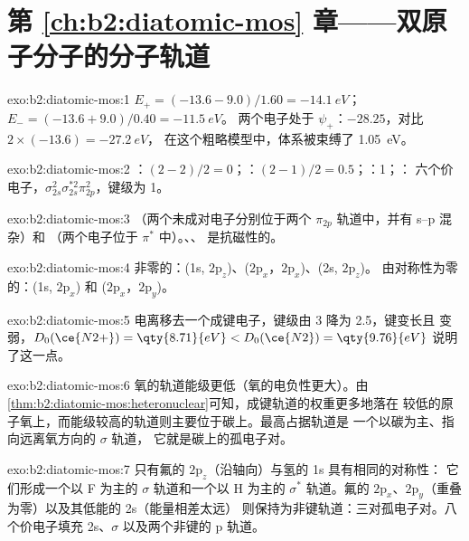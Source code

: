 \section*{第 \ref{ch:b2:diatomic-mos} 章——双原子分子的分子轨道}

\begin{solution}{exo:b2:diatomic-mos:1}
$E_+ = (-13.6 - 9.0)/1.60 = \qty{-14.1}{eV}$；$E_- = (-13.6 + 9.0)/0.40 = \qty{-11.5}{eV}$。
两个电子处于 $\psi_+$：$-28.25$，对比 $2 \times (-13.6) = \qty{-27.2}{eV}$，
在这个粗略模型中，体系被束缚了 \qty{1.05}{eV}。
\end{solution}

\begin{solution}{exo:b2:diatomic-mos:2}
：$(2 - 2)/2 = 0$；：$(2 - 1)/2 = 0.5$；：1；：
六个价电子，$\sigma_{2s}^2\sigma_{2s}^{*2}\pi_{2p}^2$，键级为 1。
\end{solution}

\begin{solution}{exo:b2:diatomic-mos:3}
（两个未成对电子分别位于两个 $\pi_{2p}$ 轨道中，并有 s--p 混杂）和
（两个电子位于 $\pi^*$ 中）。、、 是抗磁性的。
\end{solution}

\begin{solution}{exo:b2:diatomic-mos:4}
非零的：(1s, $2\mathrm p_z$)、($2\mathrm p_x$，$2\mathrm p_x$)、(2s, $2\mathrm p_z$)。
由对称性为零的：(1s, $2\mathrm p_x$) 和 ($2\mathrm p_x$，$2\mathrm p_y$)。
\end{solution}

\begin{solution}{exo:b2:diatomic-mos:5}
电离移去一个成键电子，键级由 3 降为 2.5，键变长且
变弱，$D_0(\ce{N2+}) = \qty{8.71}{eV} < D_0(\ce{N2}) = \qty{9.76}{eV}$ 说明了这一点。
\end{solution}

\begin{solution}{exo:b2:diatomic-mos:6}
氧的轨道能级更低（氧的电负性更大）。由
\cref{thm:b2:diatomic-mos:heteronuclear}可知，成键轨道的权重更多地落在
较低的原子氧上，而能级较高的轨道则主要位于碳上。最高占据轨道是
一个以碳为主、指向远离氧方向的 $\sigma$ 轨道，
它就是碳上的孤电子对。
\end{solution}

\begin{solution}{exo:b2:diatomic-mos:7}
只有氟的 $2\mathrm p_z$（沿轴向）与氢的 1s 具有相同的对称性：
它们形成一个以 F 为主的 $\sigma$ 轨道和一个以 H 为主的 $\sigma^*$ 轨道。氟的
$2\mathrm p_x$、$2\mathrm p_y$（重叠为零）以及其低能的 2s（能量相差太远）
则保持为非键轨道：三对孤电子对。八个价电子填充 2s、$\sigma$
以及两个非键的 p 轨道。
\end{solution}

